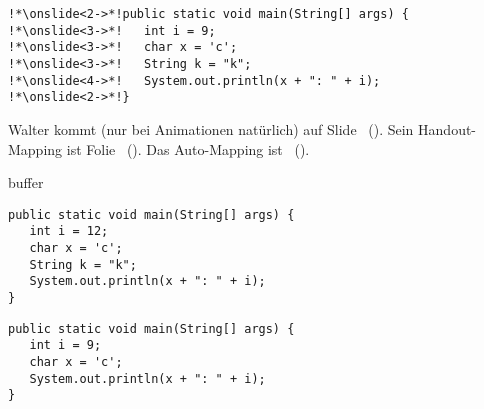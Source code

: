\documentclass{beamer}
\begin{document}
\begin{frame}[fragile]
\begin{verbatim}
!*\onslide<2->*!public static void main(String[] args) {
!*\onslide<3->*!   int i = 9;
!*\onslide<3->*!   char x = 'c';
!*\onslide<3->*!   String k = "k";
!*\onslide<4->*!   System.out.println(x + ": " + i);
!*\onslide<2->*!}
\end{verbatim}
\endAnimateCode
Walter kommt (nur bei Animationen natürlich) auf Slide \WalterAnim~(). Sein Handout-Mapping ist Folie \WalterHandout~(). Das Auto-Mapping ist \Walter~(). %
\end{frame}

\begin{frame}
   buffer
\end{frame}

\begin{frame}[fragile]
\begin{verbatim}
public static void main(String[] args) {
   int i = 12;
   char x = 'c';
   String k = "k";
   System.out.println(x + ": " + i);
}
\end{verbatim}
\endAnimateCode
\end{frame}

\begin{frame}[fragile]
\begin{verbatim}
public static void main(String[] args) {
   int i = 9;
   char x = 'c';
   System.out.println(x + ": " + i);
}
\end{verbatim}
\end{frame}
\end{document}
